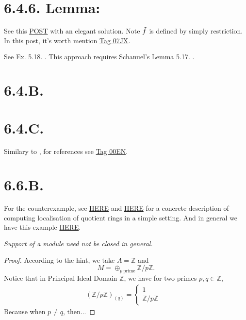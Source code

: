 \section{6.4.6. Lemma:}

See this \href{https://mathoverflow.net/questions/1788/does-finitely-presented-mean-always-finitely-presented-answered-yes}{POST} with an elegant solution. Note $\Tilde f$ is defined by simply restriction. In this post, it's worth mention \href{https://stacks.math.columbia.edu/tag/07JX}{Tag 07JX}.

See Ex. 5.18. \cite{altman2013term}. This approach requires Schanuel’s Lemma 5.17. \cite{altman2013term}.

\section{6.4.B.}\label{6.4.B.}

\section{6.4.C.}

Similary to , for references see \href{https://stacks.math.columbia.edu/tag/00EN}{Tag 00EN}.

\section{6.6.B.}

For the counterexample, see \href{https://math.stackexchange.com/questions/111214/example-of-a-module-whose-support-is-not-closed}{HERE} and \href{https://math.stackexchange.com/questions/32381/localization-at-a-prime-ideal-in-mathbbz-6-mathbbz}{HERE} for a concrete description of computing localisation of quotient rings in a simple setting. And in general we have this example \href{https://math.stackexchange.com/questions/4852147/what-are-the-localizations-of-mathbbz-n-mathbbz-at-prime-ideals-in-genera}{HERE}.

\textit{Support of a module need not be closed in general.}
\begin{proof}
	According to the hint, we take $A=\mathbb Z$ and $$M=\oplus_{p ~\text{prime}}\mathbb Z/p\mathbb Z.$$
	Notice that in Principal Ideal Domain $\mathbb Z$, we have for two primes $p,q\in\mathbb Z$,
	\begin{align*}
		(\mathbb Z/p\mathbb Z)_{(q)}=\begin{cases}
										1 & \\
										\mathbb Z/p\mathbb Z & 
									\end{cases}
	\end{align*}
	Because when $p\neq q$, then...

\end{proof}

